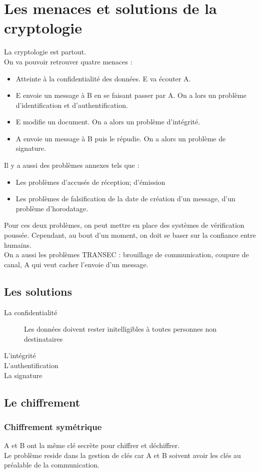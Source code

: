 \section{Les menaces et solutions de la cryptologie}
La cryptologie est partout.\\
On va pouvoir retrouver quatre menaces :
\begin{itemize}
 \item Atteinte à la confidentialité des données. E va écouter A.
 \item E envoie un message à B en se faisant passer par A. On a lors un problème d'identification et d'authentification.
 \item E modifie un document. On a alors un problème d'intégrité.
 \item A envoie un message à B puis le répudie. On a alors un problème de signature.
\end{itemize}
Il y a aussi des problèmes annexes tels que :
\begin{itemize}
 \item Les problèmes d'accusés de réception; d'émission
 \item Les problèmes de falsification de la date de création d'un message, d'un problème d'horodatage.
\end{itemize}
Pour ces deux problèmes, on peut mettre en place des systèmes de vérification poussée. Cependant, au bout d'un moment, on doit se baser sur la confiance entre humains.\\
On a aussi les problèmes TRANSEC : brouillage de communication, coupure de canal, A qui veut cacher l'envoie d'un message.
\subsection{Les solutions}
\begin{description}
 \item[La confidentialité] Les données doivent rester initelligibles à toutes personnes non destinataires
 \item[L'intégrité] 
 \item[L'authentification] 
 \item[La signature] 
\end{description}
\subsection{Le chiffrement}
\subsubsection{Chiffrement symétrique}
A et B ont la même clé secrète pour chiffrer et déchiffrer.\\
Le problème reside dans la gestion de clés car A et B soivent avoir les clés au préalable de la communication.
